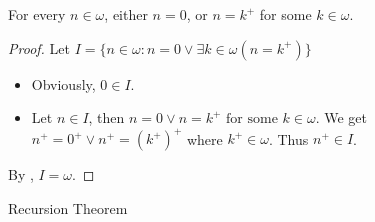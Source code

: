 \begin{theorem}{}{}
    For every $n \in \omega$, either $n = 0$, or $n = k^{+}$ for 
    some $k \in \omega$.
\end{theorem}

\begin{proof}
    Let $I = \{n \in \omega: n = 0 \lor \exists k \in \omega(n = k^{+})\}$\\
    \begin{itemize}

        \item Obviously, $0 \in I$.
        \item Let $n \in I$, then $n = 0 \lor n = k^{+} \text{ for some } k \in \omega$. 
        We get $n^{+} = 0^{+} \lor n^{+} = (k^{+})^{+}$
        where $k^{+} \in \omega$. Thus $n^{+} \in I$.

    \end{itemize}
    By , $I = \omega$.
\end{proof}

\begin{theorem}{Recursion Theorem}{}
    
\end{theorem}


